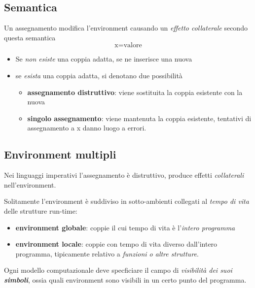 \subsection{Semantica}
Un assegnamento modifica l'environment causando un \textit{effetto collaterale} secondo questa semantica
\begin{equation*}
    \text{x} = \text{valore}
\end{equation*}

\begin{itemize}
    \item Se \textit{non esiste} una coppia adatta, se ne inserisce una nuova
    \item se \textit{esista} una coppia adatta, si denotano due possibilità
    \begin{itemize}
        \item \textbf{assegnamento distruttivo}: viene sostituita la coppia esistente con la nuova
        \item \textbf{singolo assegnamento}: viene mantenuta la coppia esistente, tentativi di assegnamento a x danno luogo a errori.
    \end{itemize}
\end{itemize}

\subsection{Environment multipli}

Nei linguaggi imperativi l'assegnamento è distruttivo, produce effetti \textit{collaterali} nell'environment.

Solitamente l'environment è suddiviso in sotto-ambienti collegati al \textit{tempo di vita} delle strutture run-time:
\begin{itemize}
    \item \textbf{environment globale}: coppie il cui tempo di vita è l'\textit{intero programma}
    \item \textbf{environment locale}: coppie con tempo di vita diverso dall'intero programma, tipicamente relativo a \textit{funzioni o altre strutture}.
\end{itemize}

Ogni modello computazionale deve specficiare il campo di \textit{visibilità dei suoi \textbf{simboli}}, ossia quali environment sono visibili in un certo punto del programma.

